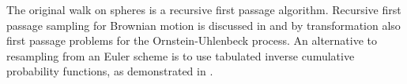 \documentclass[a4paper,12pt]{article}
\begin{document}


\begin{related}
    The original walk on spheres is a recursive first passage algorithm.
    Recursive first passage sampling for
    Brownian motion is discussed in \cite{herrmann_first-passage_2016}
    and by transformation also first passage problems for the
    Ornstein-Uhlenbeck process.
    An alternative to resampling from an Euler scheme is to use tabulated
    inverse cumulative probability functions,
    as demonstrated in \cite{hwang_simulationtabulation_2001}.
\end{related}




\end{document}

